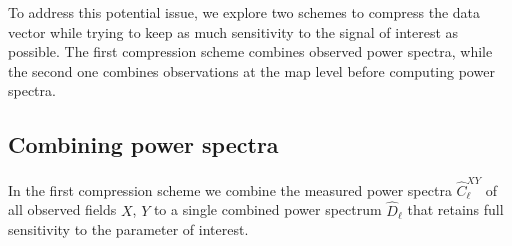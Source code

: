 \documentclass[prd,superscriptaddress,floatfix,notitlepage,nofootinbib,reprint]{revtex4-1} %
\begin{document}
To address this potential issue, we explore two schemes to compress the data vector while trying to keep as much sensitivity to the signal of interest as possible.
The first compression scheme combines observed power spectra, while the second one combines  observations at the map level before computing power spectra.




\subsection{Combining power spectra}
\label{se:CombinedCls}
In the first compression scheme we combine the measured power spectra $\hat C^{XY}_\ell$ of all observed fields $X$, $Y$ to a single combined power spectrum $\hat D_\ell$ that retains full sensitivity to the parameter of interest.
\end{document}
